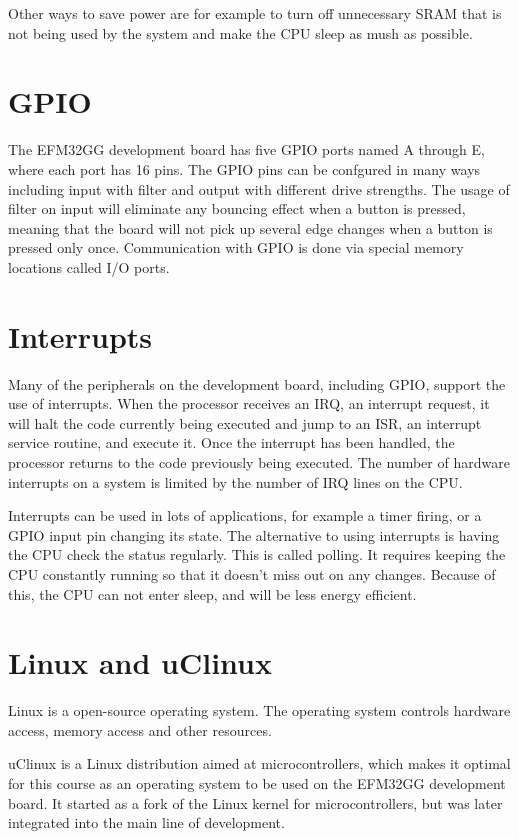 Other ways to save power are for example to turn off unnecessary SRAM that is not being used by the system and make the CPU sleep as mush as possible. 

\section{GPIO}
The EFM32GG development board has five GPIO ports named A through E, where each port has 16 pins. The GPIO pins can be confgured in many ways including input with filter and output with different drive strengths. The usage of filter on input will eliminate any bouncing effect when a button is pressed, meaning that the board will not pick up several edge changes when a button is pressed only once. Communication with GPIO is done via special memory locations called I/O ports.

\section{Interrupts}
Many of the peripherals on the development board, including GPIO, support the use of interrupts. When the processor receives an IRQ, an interrupt request, it will halt the code currently being executed and jump to an ISR, an interrupt service routine, and execute it. Once the interrupt has been handled, the processor returns to the code previously being executed. The number of hardware interrupts on a system is limited by the number of IRQ lines on the CPU.

Interrupts can be used in lots of applications, for example a timer firing, or a GPIO input pin changing its state. The alternative to using interrupts is having the CPU check the status regularly. This is called polling. It requires keeping the CPU constantly running so that it doesn't miss out on any changes. Because of this, the CPU can not enter sleep, and will be less energy efficient.

\section{Linux and uClinux}
Linux is a open-source operating system. The operating system controls hardware access, memory access and other resources.

uClinux is a Linux distribution aimed at microcontrollers, which makes it optimal for this course as an operating system to be used on the EFM32GG development board. It started as a fork of the Linux kernel for microcontrollers, but was later integrated into the main line of development. 

